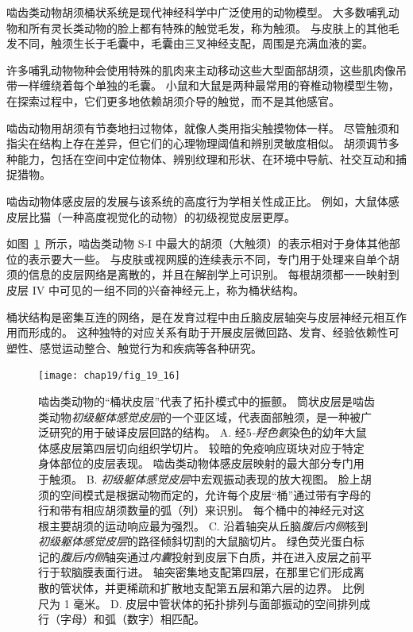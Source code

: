 \begin{proposition}[啮齿动物须桶系统] \label{box:19_2}
	
	\quad \quad 啮齿类动物胡须桶状系统是现代神经科学中广泛使用的动物模型。
	大多数哺乳动物和所有灵长类动物的脸上都有特殊的触觉毛发，称为触须。
	与皮肤上的其他毛发不同，触须生长于毛囊中，毛囊由三叉神经支配，周围是充满血液的窦。
	
	\quad \quad 许多哺乳动物物种会使用特殊的肌肉来主动移动这些大型面部胡须，这些肌肉像吊带一样缠绕着每个单独的毛囊。
	小鼠和大鼠是两种最常用的脊椎动物模型生物，在探索过程中，它们更多地依赖胡须介导的触觉，而不是其他感官。
	
	\quad \quad 啮齿动物用胡须有节奏地扫过物体，就像人类用指尖触摸物体一样。
	尽管触须和指尖在结构上存在差异，但它们的心理物理阈值和辨别灵敏度相似。
	胡须调节多种能力，包括在空间中定位物体、辨别纹理和形状、在环境中导航、社交互动和捕捉猎物。
	
	\quad \quad 啮齿动物体感皮层的发展与该系统的高度行为学相关性成正比。
	例如，大鼠体感皮层比猫（一种高度视觉化的动物）的初级视觉皮层更厚。
	
	
	\quad \quad 如图~\ref{fig:19_16}~所示，啮齿类动物 S-I 中最大的胡须（大触须）的表示相对于身体其他部位的表示要大一些。
	与皮肤或视网膜的连续表示不同，专门用于处理来自单个胡须的信息的皮层网络是离散的，并且在解剖学上可识别。
	每根胡须都一一映射到皮层 IV 中可见的一组不同的兴奋神经元上，称为桶状结构。
	
	
	\quad \quad 桶状结构是密集互连的网络，是在发育过程中由丘脑皮层轴突与皮层神经元相互作用而形成的。
	这种独特的对应关系有助于开展皮层微回路、发育、经验依赖性可塑性、感觉运动整合、触觉行为和疾病等各种研究。
	
\end{proposition}


\begin{figure}[htbp]
	\centering
	\texttt{[image: chap19/fig\_19\_16]}
	\caption{啮齿类动物的“桶状皮层”代表了拓扑模式中的振颤。
		筒状皮层是啮齿类动物\textit{初级躯体感觉皮层}的一个亚区域，代表面部触须，是一种被广泛研究的用于破译皮层回路的结构。
		A. 经5\textit{-羟色氨}染色的幼年大鼠体感皮层第四层切向组织学切片。
		较暗的免疫响应斑块对应于特定身体部位的皮层表现。
		啮齿类动物体感皮层映射的最大部分专门用于触须。
		B. \textit{初级躯体感觉皮层}中宏观振动表现的放大视图。
		脸上胡须的空间模式是根据动物而定的，允许每个皮层“桶”通过带有字母的行和带有相应胡须数量的弧（列）来识别。
		每个桶中的神经元对这根主要胡须的运动响应最为强烈。
		C. 沿着轴突从丘脑\textit{腹后内侧}核到\textit{初级躯体感觉皮层}的路径倾斜切割的大鼠脑切片。
		绿色荧光蛋白标记的\textit{腹后内侧}轴突通过\textit{内囊}投射到皮层下白质，并在进入皮层之前平行于软脑膜表面行进。
		轴突密集地支配第四层，在那里它们形成离散的管状体，并更稀疏和扩散地支配第五层和第六层的边界。
		比例尺为 1 毫米。
		D. 皮层中管状体的拓扑排列与面部振动的空间排列成行（字母）和弧（数字）相匹配。}
	\label{fig:19_16}
\end{figure}



